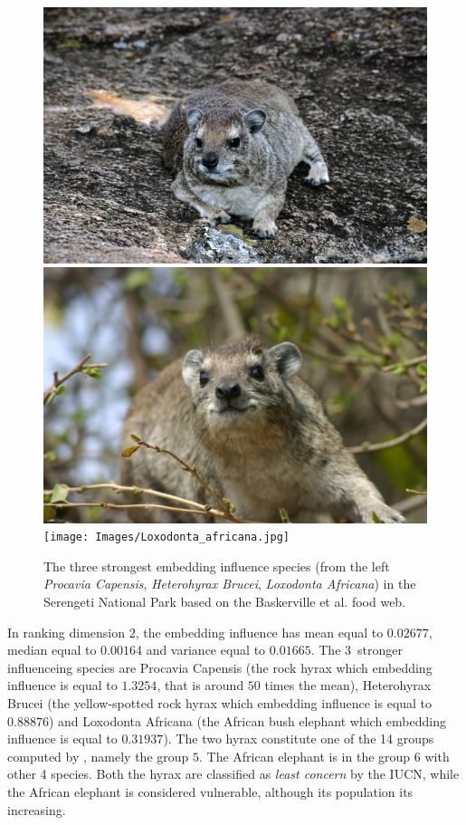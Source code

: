 \documentclass[12pt]{article}
\theoremstyle{definition}
\begin{document}
\begin{figure}[!htb]
  \includegraphics[width=\linewidth]{Images/Procavia.jpg}
\endminipage\hfill
{}
  \includegraphics[width=\linewidth]{Images/Heterohyrax.jpg}
\endminipage\hfill
{}
  \texttt{[image: Images/Loxodonta\_africana.jpg]}
\endminipage
\caption{The three strongest embedding influence species (from the left \textit{Procavia Capensis}, \textit{Heterohyrax Brucei}, \textit{Loxodonta Africana}) in the Serengeti National Park based on the Baskerville et al. food web.}
\end{figure}

In ranking dimension $2$, the embedding influence has mean equal to $0.02677$, median equal to $0.00164$ and variance equal to $0.01665$. The $3$~stronger influenceing species are Procavia Capensis (the rock hyrax which embedding influence is equal to $1.3254$, that is around $50$ times the mean), Heterohyrax Brucei (the yellow-spotted rock hyrax which embedding influence is equal to $0.88876$) and Loxodonta Africana (the African bush elephant which embedding influence is equal to $0.31937$). The two hyrax constitute one of the 14 groups computed by \cite{baskerville2011spatial}, namely the group $5$. The African elephant is in the group $6$ with other 4 species. Both the hyrax are classified as {\em least concern} by the IUCN, while the African elephant is considered vulnerable, although its population its increasing.
\end{document}

